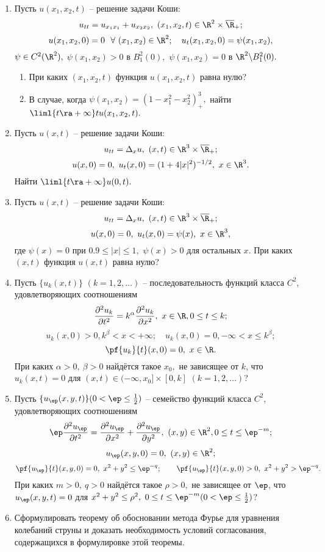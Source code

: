 \documentclass[a4paper]{article}
\def\a{\alpha}
\def\b{\beta}
\def\D{\Delta}
\begin{document}
\begin{enumerate}
\item
Пусть $u(x_1,x_2,t)$ -- решение задачи Коши:
$$u_{tt}=u_{x_1x_1} + u_{x_2x_2},\ (x_1,x_2,t)\in \R^2\times
\overline{\R}_+;$$
$$u(x_1,x_2,0)=0\ \ \forall\ (x_1,x_2)\in \R^2;\quad
u_t(x_1,x_2,0)=\psi(x_1,x_2),$$
$\psi\in C^2(\R^2),$ $\psi(x_1,x_2)>0$ в $B_1^2(0),$
$\psi(x_1,x_2)=0$ в $\R^2\backslash B_1^2(0).$
\begin{enumerate}
\item
При каких $(x_1, x_2,t)$ функция $u(x_1,x_2,t)$ равна нулю?
\item
В случае, когда $\psi(x_1,x_2)=(1-x_1^2-x_2^2)^3_+,$ найти
$\liml{t\ra+\infty} t u(x_1,x_2,t).$
\end{enumerate}

\item
Пусть $u(x,t)$ -- решение задачи Коши:
$$
u_{tt}=\D_x u, \ (x,t)\in \R^3\times\overline{\R}_+;$$
$$
u(x,0)=0, \ u_t(x,0)=(1+4|x|^2)^{-1/2}, \ x\in \R^3.$$
Найти $\liml{t\ra+\infty} u(0,t).$

\item
Пусть $u(x,t)$ -- решение задачи Коши:
$$
u_{tt}=\D_x u, \ (x,t)\in \R^3\times\overline{\R}_+;$$
$$
u(x,0)=0, \ u_t(x,0)=\psi(x), \ x\in \R^3,$$
где $\psi(x)=0$ при $0.9\le|x|\le1,$ $\psi(x)>0$ для остальных $x.$
При каких $(x,t)$ функция $u(x,t)$ равна нулю?

\item
Пусть $\{u_k(x,t)\}$ $(k=1,2,\dots)$ -- последовательность функций класса
$C^2$, удовлетворяющих соотношениям
$$
\frac{\partial^2 u_k}{\partial t^2} =k^\a \frac{\partial^2 u_k}{\partial x^2},
\ x\in\R, 0\le t\le k;$$
$$u_k(x,0)>0, k^\b<x<+\infty;\quad
u_k(x,0)=0, -\infty<x\le k^\b;$$
$$\pf{u_k}{t}(x,0)=0, \ x\in\R.$$
При каких $\a>0,\ \b>0$ найд\"ется такое $x_0,$ не зависящее от $k$,
что $u_k(x,t)=0$ для $(x,t)\in (-\infty, x_0]\times[0,k]$ $(k=1,2,\dots)$?

\item
Пусть $\{u_\ep(x,y,t)\} (0<\ep\le\frac{1}{2})$ -- семейство функций класса
$C^2$, удовлетворяющих соотношениям
$$
\ep\frac{\partial^2 u_\ep}{\partial t^2} = \frac{\partial^2 u_\ep}
{\partial x^2}+ \frac{\partial^2 u_\ep}{\partial y^2},
\ (x,y)\in\R^2, 0\le t\le \ep^{-m};$$
$$u_\ep(x,y,0)=0, \ (x,y)\in\R^2;$$
$$\pf{u_\ep}{t}(x,y,0)=0, \ x^2+y^2\le \ep^{-q};\qquad
\pf{u_\ep}{t}(x,y,0)>0, \ x^2+y^2> \ep^{-q}.$$
При каких $m>0,\ q>0$ найд\"ется такое $\rho>0,$ не зависящее от $\ep$,
что $u_\ep(x,y,t)=0$ для $x^2+y^2\le\rho^2, \ 0\le t\le \ep^{-m}
(0<\ep\le\frac{1}{2})$?

\item
Сформулировать теорему об обосновании метода Фурье для уравнения колебаний
струны и доказать необходимость условий согласования, содержащихся в
формулировке этой теоремы.


\end{enumerate}
\end{document}
